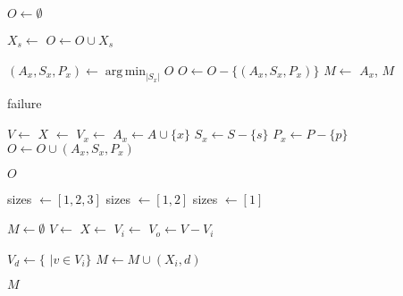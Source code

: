 \documentclass{article}
\DeclareMathOperator*{\argmin}{arg\,min}
\begin{document}
\begin{algorithmic}
        \State $O \gets \emptyset$

            \State $X_s \gets$ 
            \State $O \gets O \cup X_s$
        \EndFor

            \State $(A_x, S_x, P_x) \gets \argmin_{|S_x|} O$
            \State $O \gets O - \{(A_x, S_x, P_x)\}$
                \State $M \gets$ 
                    \State \Return $A_x$, $M$
                \EndIf
            \EndIf

            \State {}
        \EndWhile

        \State \Return failure
    \EndFunction
\end{algorithmic}

\newpage

\begin{algorithmic}
        \State $V \gets$ 
                \State $X$ $\gets$ 
                    \State $V_x \gets$ 
                        \State $A_x \gets A \cup \{x\}$
                        \State $S_x \gets S - \{s\}$
                        \State $P_x \gets P - \{p\}$
                        \State $O \gets O \cup (A_x, S_x, P_x)$
                    \EndIf
                \EndFor
            \EndFor
        \EndFor

        \State \Return $O$
    \EndFunction
\end{algorithmic}

\newpage

\begin{algorithmic}
            \State sizes $\gets [1, 2, 3]$
            \State sizes $\gets [1, 2]$
        \Else
            \State sizes $\gets [1]$
        \EndIf

        \State $M \gets \emptyset$
        \State $V \gets$ 
            \State $X \gets$ 
                \State $V_i \gets$ 
                \State $V_o \gets V - V_i$

                    \State $V_d \gets \{$ $\mid v \in V_i\}$
                        \State $M \gets M \cup (X_i, d)$
                    \EndIf
                \EndFor
            \EndFor
        \EndFor

        \State \Return $M$        
    \EndFunction
\end{algorithmic}
\end{document}
